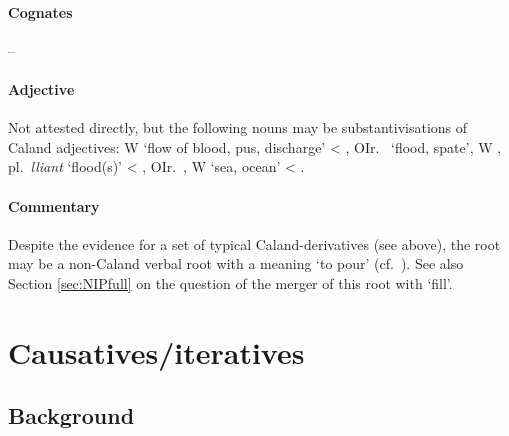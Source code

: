 \documentclass[output=paper,colorlinks,citecolor=brown]{langscibook}
\begin{document}
\paragraph*{Cognates}  -- 

\paragraph*{Adjective}

Not attested directly, but the following nouns may be substantivisations of Caland adjectives:  W  ‘flow of blood, pus, discharge’ < , OIr.\   ‘flood, spate’, W , pl.\ \textit{lliant} ‘flood(s)’ < , OIr.\  , W  ‘sea, ocean’ < .

\paragraph*{Commentary}

Despite the evidence for a set of typical Caland-derivatives (see above),  the root  may be a non-Caland verbal root with a meaning ‘to pour’ (cf.\ ). See also Section \ref{sec:NIPfull} on the question of the merger of this root with  ‘fill’. 

\section{Causatives/iteratives}
\label{sec:CelticCaus}
\subsection{Background}
\largerpage
\end{document}
